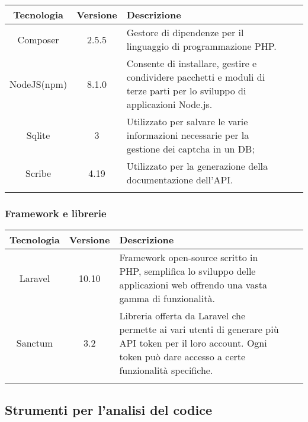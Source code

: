 \begin{center}
\setlength\extrarowheight{5pt}
\renewcommand\tabularxcolumn[1]{>{\Centering}m{#1}}
\begin{tabularx}{\textwidth}{| c | c | X | X | X |} 
	\hline
	\rowcolor{white}
	\textbf{Tecnologia} & \textbf{Versione} & \textbf{Descrizione}\\
	\hline
	Composer & 2.5.5 &  Gestore di dipendenze per il linguaggio di programmazione PHP.\\
	\hline
	NodeJS(npm) & 8.1.0 & Consente di installare, gestire e condividere pacchetti e moduli di terze parti per lo sviluppo di applicazioni Node.js.\\
	\hline
	Sqlite & 3 & Utilizzato per salvare le varie informazioni necessarie per la gestione dei captcha in un DB;\\
	\hline
	Scribe & 4.19 & Utilizzato per la generazione della documentazione dell'API.\\
	\rowcolor{white}
	\caption{Strumenti utilizzati}
\end{tabularx}
\end{center}
\newpage
\subsubsection{Framework e librerie}

\begin{center}
\setlength\extrarowheight{5pt}
\renewcommand\tabularxcolumn[1]{>{\Centering}m{#1}}
\begin{tabularx}{\textwidth}{| c | c | X | X | X |} 
	\hline
	\rowcolor{white}
	\textbf{Tecnologia} & \textbf{Versione} & \textbf{Descrizione}\\
	\hline
	Laravel & 10.10 & Framework open-source scritto in PHP, semplifica lo sviluppo delle applicazioni web offrendo una vasta gamma di funzionalità.\\
	\hline
	Sanctum & 3.2 & Libreria offerta da Laravel che permette ai vari utenti di generare più API token per il loro account. Ogni token può dare accesso a certe funzionalità specifiche.\\
	\hline
	\rowcolor{white}
	\caption{Framework e librerie utilizzati}
\end{tabularx}
\end{center}

\subsection{Strumenti per l’analisi del codice}

